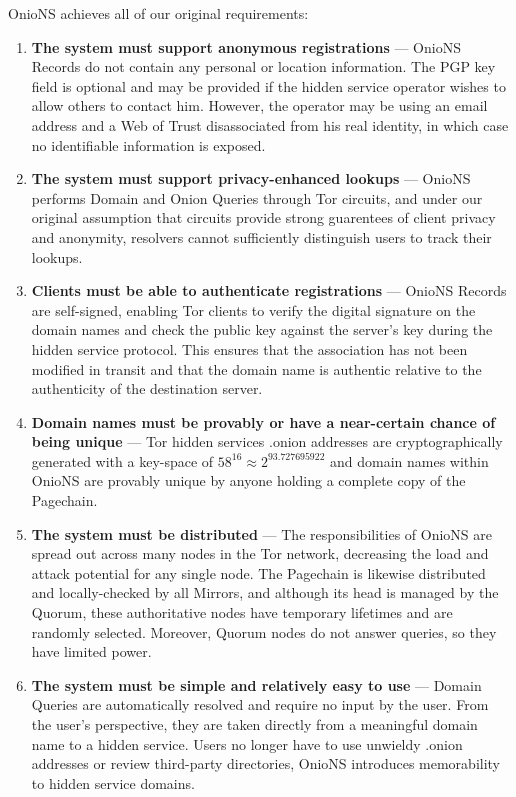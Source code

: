 OnioNS achieves all of our original requirements:

\begin{enumerate}
	\item \textbf{The system must support anonymous registrations} --- OnioNS Records do not contain any personal or location information. The PGP key field is optional and may be provided if the hidden service operator wishes to allow others to contact him. However, the operator may be using an email address and a Web of Trust disassociated from his real identity, in which case no identifiable information is exposed.
	\item \textbf{The system must support privacy-enhanced lookups} --- OnioNS performs Domain and Onion Queries through Tor circuits, and under our original assumption that circuits provide strong guarentees of client privacy and anonymity, resolvers cannot sufficiently distinguish users to track their lookups.
	\item \textbf{Clients must be able to authenticate registrations} --- OnioNS Records are self-signed, enabling Tor clients to verify the digital signature on the domain names and check the public key against the server's key during the hidden service protocol. This ensures that the association has not been modified in transit and that the domain name is authentic relative to the authenticity of the destination server.
	\item \textbf{Domain names must be provably or have a near-certain chance of being unique} --- Tor hidden services .onion addresses are cryptographically generated with a key-space of $ 58 ^ {16} \approx 2 ^ {93.727695922} $ and domain names within OnioNS are provably unique by anyone holding a complete copy of the Pagechain.
	\item \textbf{The system must be distributed} --- The responsibilities of OnioNS are spread out across many nodes in the Tor network, decreasing the load and attack potential for any single node. The Pagechain is likewise distributed and locally-checked by all Mirrors, and although its head is managed by the Quorum, these authoritative nodes have temporary lifetimes and are randomly selected. Moreover, Quorum nodes do not answer queries, so they have limited power.
	\item \textbf{The system must be simple and relatively easy to use} --- Domain Queries are automatically resolved and require no input by the user. From the user's perspective, they are taken directly from a meaningful domain name to a hidden service. Users no longer have to use unwieldy .onion addresses or review third-party directories, OnioNS introduces memorability to hidden service domains.

\end{enumerate}
